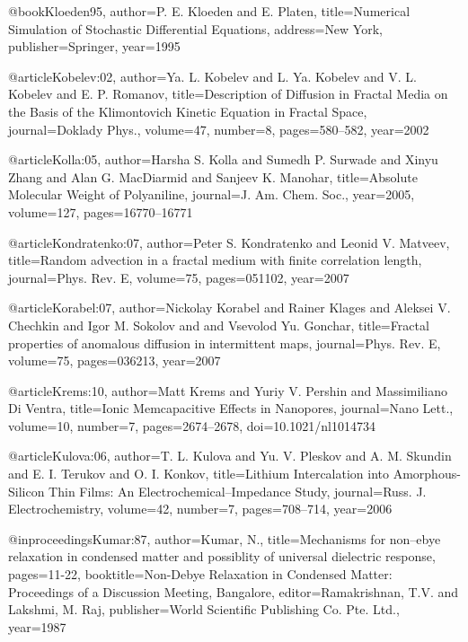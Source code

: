 \begin{thebibliography}{99}
@book{Kloeden95,
  author={P. E. Kloeden and E. Platen},
  title={Numerical Simulation of Stochastic Differential Equations},
  address={New York},
  publisher={Springer},
  year={1995}
}

@article{Kobelev:02,
  author={Ya. L. Kobelev and L. Ya. Kobelev and V. L. Kobelev and E. P. Romanov},
  title={Description of Diffusion in Fractal Media on the Basis of the {K}limontovich
    Kinetic Equation in Fractal Space},
  journal={Doklady Phys.},
  volume={47},
  number={8},
  pages={580--582},
  year={2002}
}

@article{Kolla:05,
  author={Harsha S. Kolla and Sumedh P. Surwade and Xinyu Zhang and Alan G. MacDiarmid
    and Sanjeev K. Manohar},
  title={Absolute Molecular Weight of {P}olyaniline},
  journal={J. Am. Chem. Soc.},
  year={2005},
  volume={127},
  pages={16770--16771}
}

@article{Kondratenko:07,
  author={Peter S. Kondratenko and Leonid V. Matveev},
  title={Random advection in a fractal medium with finite correlation length},
  journal={Phys. Rev. E},
  volume={75},
  pages={051102},
  year={2007}
}

@article{Korabel:07,
  author={Nickolay Korabel and Rainer Klages and Aleksei V. Chechkin and Igor M.
    Sokolov and and Vsevolod Yu. Gonchar},
  title={Fractal properties of anomalous diffusion in intermittent maps},
  journal={Phys. Rev. E},
  volume={75},
  pages={036213},
  year={2007}
}

@article{Krems:10,
  author={Matt Krems and Yuriy V. Pershin and Massimiliano Di Ventra},
  title={Ionic Memcapacitive Effects in Nanopores},
  journal={Nano Lett.},
  volume={10},
  number={7},
  pages={2674--2678},
  doi={10.1021/nl1014734}
}

@article{Kulova:06,
  author={T. L. Kulova and Yu. V. Pleskov and A. M. Skundin and E. I. Terukov and
    O. I. Konkov},
  title={Lithium Intercalation into Amorphous-Silicon Thin Films: An Electrochemical--Impedance
    Study},
  journal={Russ. J. Electrochemistry},
  volume={42},
  number={7},
  pages={708--714},
  year={2006}
}

@inproceedings{Kumar:87,
  author={Kumar, N.},
  title={Mechanisms for non--ebye relaxation in condensed matter
    and possiblity of universal dielectric response},
  pages={11-22},
  booktitle={Non-Debye Relaxation in Condensed Matter: Proceedings of a Discussion
    Meeting, Bangalore},
  editor={Ramakrishnan, T.V. and Lakshmi, M. Raj},
  publisher={World Scientific Publishing Co. Pte. Ltd.},
  year={1987}
}


\end{thebibliography}
